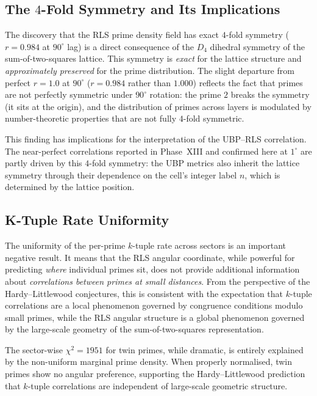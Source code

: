 \documentclass[11pt,a4paper]{article}
\theoremstyle{definition}
\begin{document}
\subsection{The $4$-Fold Symmetry and Its Implications}

The discovery that the RLS prime density field has exact $4$-fold symmetry
($r = 0.984$ at $90^{\circ}$ lag) is a direct consequence of the $D_4$
dihedral symmetry of the sum-of-two-squares lattice.  This symmetry is
\emph{exact} for the lattice structure and \emph{approximately preserved}
for the prime distribution.  The slight departure from perfect $r = 1.0$ at
$90^{\circ}$ ($r = 0.984$ rather than $1.000$) reflects the fact that primes
are not perfectly symmetric under $90^{\circ}$ rotation: the prime $2$ breaks
the symmetry (it sits at the origin), and the distribution of primes across
layers is modulated by number-theoretic properties that are not fully
$4$-fold symmetric.

This finding has implications for the interpretation of the UBP--RLS
correlation.  The near-perfect correlations reported in Phase~XIII and
confirmed here at $1^{\circ}$ are partly driven by this $4$-fold symmetry:
the UBP metrics also inherit the lattice symmetry through their dependence on
the cell's integer label $n$, which is determined by the lattice position.

\subsection{K-Tuple Rate Uniformity}

The uniformity of the per-prime $k$-tuple rate across sectors is an important
negative result.  It means that the RLS angular coordinate, while powerful for
predicting \emph{where} individual primes sit, does not provide additional
information about \emph{correlations between primes at small distances}.  From
the perspective of the Hardy--Littlewood conjectures, this is consistent with
the expectation that $k$-tuple correlations are a local phenomenon governed
by congruence conditions modulo small primes, while the RLS angular structure
is a global phenomenon governed by the large-scale geometry of the
sum-of-two-squares representation.

The sector-wise $\chi^2 = 1951$ for twin primes, while dramatic, is entirely
explained by the non-uniform marginal prime density.  When properly
normalised, twin primes show no angular preference, supporting the
Hardy--Littlewood prediction that $k$-tuple correlations are independent of
large-scale geometric structure.
\end{document}
